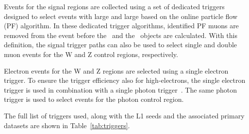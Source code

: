 Events for the signal regions are collected using a set of dedicated
triggers designed to select events with large \ptmiss and large \mht based on
the online particle flow (PF) algorithm. In these dedicated trigger algorithms,
identified PF muons are removed from the event before the
\ptmiss~and the \mht~objects are calculated. With this definition, the signal trigger paths can also be used to select single and double muon events for the W and Z control regions, respectively.

Electron events for the W and Z regions are selected using a single electron trigger. To ensure the trigger efficiency also for high-\pt electrons, the single electron trigger is used in combination with a single photon trigger~\cite{CMS-EGM-TWIKI-HLT}. The same photon trigger is used to select events for the photon control region.

The full list of triggers used, along with the L1 seeds and the associated primary datasets are shown in Table~\ref{tab:triggers}.

